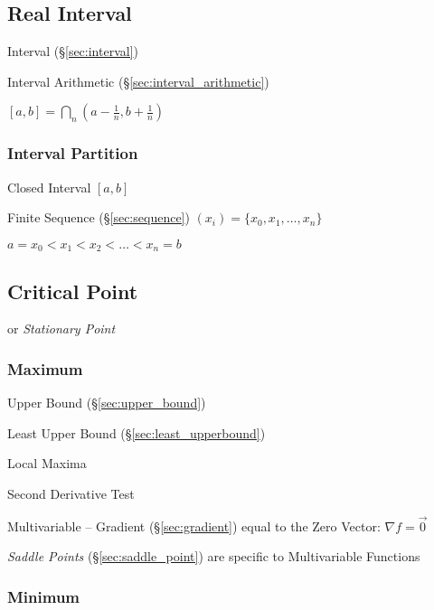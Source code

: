 \subsection{Real Interval}\label{sec:real_interval}

Interval (\S\ref{sec:interval})

Interval Arithmetic (\S\ref{sec:interval_arithmetic})

$[a,b] = \bigcap_n (a - \frac{1}{n}, b + \frac{1}{n})$



\subsubsection{Interval Partition}\label{sec:interval_partition}

Closed Interval $[a,b]$

Finite Sequence (\S\ref{sec:sequence}) $(x_i) = \{ x_0, x_1, \ldots,
x_n \}$

$a = x_0 < x_1 < x_2 < \ldots < x_n = b$



\subsection{Critical Point}\label{sec:critical_point}

or \emph{Stationary Point}



\subsubsection{Maximum}\label{sec:maximum}

Upper Bound (\S\ref{sec:upper_bound})

Least Upper Bound (\S\ref{sec:least_upperbound})

Local Maxima

Second Derivative Test

Multivariable -- Gradient (\S\ref{sec:gradient}) equal to the Zero Vector:
$\nabla{f} = \vec{0}$

\fist \emph{Saddle Points} (\S\ref{sec:saddle_point}) are specific to
Multivariable Functions



\subsubsection{Minimum}\label{sec:minimum}

